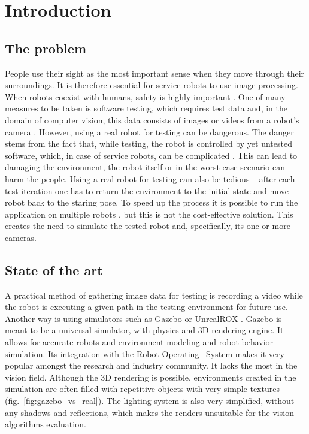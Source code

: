 \documentclass{svproc}
\begin{document}
\section{Introduction}

\subsection{The problem}

People use their sight as the most important sense when they move through their surroundings.
It is therefore essential for service robots to use image processing.
When robots coexist with humans, safety is highly important \cite{haddadin2007safety}.
One of many measures to be taken is software testing,
which requires test data and, in the domain of computer vision, this data consists of images or videos from a robot's camera \cite{7759425}.
However, using a real robot for testing can be dangerous.
The danger stems from the fact that, while testing, the robot is controlled by yet untested software, which, in case of service robots, can be complicated \cite{Dudek-multitasking-romoco-2019-twiki}. This can lead to damaging the environment, the robot itself or in the worst case scenario can harm the people.
Using a real robot for testing can also be tedious -- after each test iteration one has to return the environment to the initial state and move robot back to the staring pose.
To speed up the process it is possible to run the application on multiple robots \cite{levine2018learning}, but this is not the cost-effective solution.
This creates the need to simulate the tested robot and, specifically, its one or more cameras.

\subsection{State of the art}

A practical method of gathering image data for testing is recording a video while the robot is executing a given path in the testing environment for future use.
Another way is using simulators such as Gazebo \cite{koenig2004design} or UnrealROX \cite{martinez2019unrealrox}.
Gazebo is meant to be a universal simulator, with physics and 3D rendering engine. It allows for accurate 
robots and environment modeling and robot behavior simulation. Its integration with the Robot Operating \
System makes it very popular amongst the research and industry community. It lacks the most in the vision 
field. Although the 3D rendering is possible, environments created in the simulation are often filled
with repetitive objects with very simple textures (fig.~\ref{fig:gazebo_vs_real}).
 The lighting system is also very simplified, without any 
shadows and reflections, which makes the renders unsuitable for the vision algorithms evaluation. 
\end{document}

